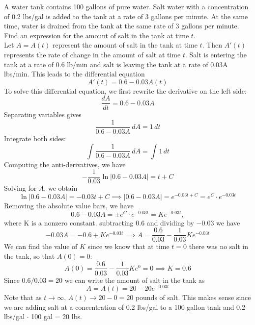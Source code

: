 \documentclass[handout]{ximera}
\begin{document}
\begin{example}[example 6]
A water tank contains 100 gallons of pure water. Salt water with a concentration of 0.2 lbs/gal is added to the tank at a rate of 3 gallons per minute.
At the same time, water is drained from the tank at the same rate of 3 gallons per minute.
Find an expression for the amount of salt in the tank at time $t$.\\
Let $A = A(t)$ represent the amount of salt in the tank at time $t$. Then $A'(t)$ represents the rate of change in the amount of salt at time $t$. Salt is entering the tank at a rate of 0.6 lb/min and 
salt is leaving the tank at a rate of 0.03A lbs/min. This leads to the differential equation
\[
A'(t) = 0.6 - 0.03A(t) 
\]
To solve this differential equation, we first rewrite the derivative on the left side:
\[
\frac{dA}{dt} = 0.6 - 0.03A
\]
Separating variables gives
\[
\frac{1}{0.6 -0.03A} \, dA = 1\, dt
\]
Integrate both sides:
\[
\int \frac{1}{0.6 -0.03A} \, dA = \int 1 \, dt
\]
Computing the anti-derivatives, we have
\[
-\frac{1}{0.03}\ln|0.6 - 0.03A|  = t + C
\]
Solving for $A$, we obtain
\[
\ln|0.6 - 0.03A|  = -0.03t + C \implies |0.6-0.03A| = e^{-0.03t + C} = e^C \cdot e^{-0.03t}
\]
Removing the absolute value bars, we have
\[
0.6 - 0.03A = \pm e^C \cdot e^{-0.03t} = Ke^{-0.03t},
\]
where K is a nonzero constant.
subtracting $0.6$ and dividing by $-0.03$ we have 
\[
-0.03A = -0.6 + Ke^{-0.03t} \implies A = \frac{0.6}{0.03} - \frac{1}{0.03}Ke^{-0.03t}
\]
We can find the value of $K$ since we know that at time $t = 0$ there was no salt in the tank, so that $A(0) = 0$:
\[
A(0) = \frac{0.6}{0.03} - \frac{1}{0.03}Ke^0 = 0 \implies  K = 0.6
\]
Since $0.6/0.03 = 20$ we can write the amount of salt in the tank as
\[
A= A(t) = 20 - 20e^{-0.03t}
\]
Note that as $t\to \infty$, $A(t) \to 20 - 0 = 20$ pounds of salt. 
This makes sense since we are adding salt at a concentration of 0.2 lbs/gal to a 100 gallon tank and 0.2 lbs/gal $\cdot$ 100 gal = 20 lbs.
\end{example}
\end{document}
